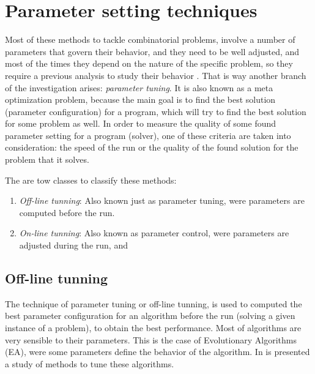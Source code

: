 
\section{Parameter setting techniques}
\label{sec:tunning}

Most of these methods to tackle combinatorial problems, involve a number of parameters that govern their behavior, and they need to be well adjusted, and most of the times they depend on the nature of the specific problem, so they require a previous analysis to study their behavior \cite{Birattari2005}. That is way another branch of the investigation arises: {\it parameter tuning}. It is also known as a meta optimization problem, because the main goal is to find the best solution (parameter configuration) for a program, which will try to find the best solution for some problem as well. In order to measure the quality of some found parameter setting for a program (solver), one of these criteria are taken into consideration: the speed of the run or the quality of the found solution for the problem that it solves.

The are tow classes to classify these methods: 
\begin{enumerate}
\item \textit{Off-line tunning}: Also known just as parameter tuning, were parameters are computed before the run.
\item \textit{On-line tunning}: Also known as parameter control, were parameters are adjusted during the run, and
\end{enumerate}

\subsection{Off-line tunning}

The technique of parameter tuning or off-line tunning, is used to computed the best parameter configuration for an algorithm before the run (solving a given instance of a problem), to obtain the best performance. Most of algorithms are very sensible to their parameters. This is the case of Evolutionary Algorithms (EA), were some parameters define the behavior of the algorithm. In \cite{A.E.Eiben2012} is presented a study of methods to tune these algorithms.

